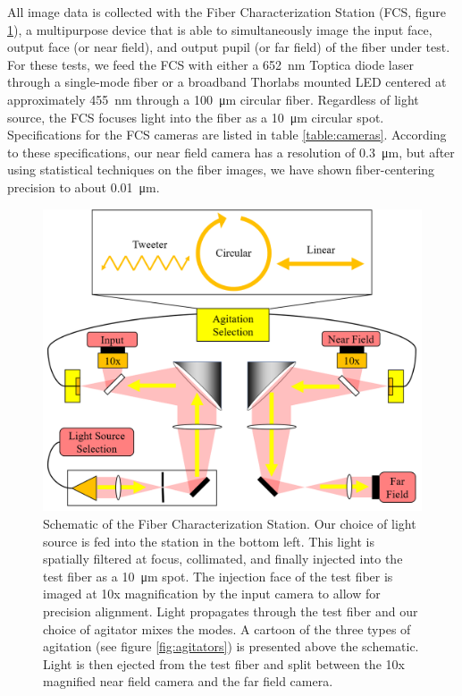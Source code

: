 \documentclass[twocolumn]{emulateapj}
\begin{document}
All image data is collected with the Fiber Characterization Station (FCS, figure \ref{fig:fcs}), a multipurpose device that is able to simultaneously image the input face, output face (or near field), and output pupil (or far field) of the fiber under test. For these tests, we feed the FCS with either a \SI{652}{\nano\meter} Toptica diode laser through a single-mode fiber or a broadband Thorlabs mounted LED centered at approximately \SI{455}{\nano\meter} through a \SI{100}{\micro\meter} circular fiber. Regardless of light source, the FCS focuses light into the fiber as a \SI{10}{\micro\meter} circular spot. Specifications for the FCS cameras are listed in table \ref{table:cameras}. According to these specifications, our near field camera has a resolution of \SI{0.3}{\micro\meter}, but after using statistical techniques on the fiber images, we have shown fiber-centering precision to about \SI{0.01}{\micro\meter}. 

\begin{figure}
\centering
	\includegraphics[width=\columnwidth]{images/fcs_schematic.png}
	\caption{Schematic of the Fiber Characterization Station. Our choice of light source is fed into the station in the bottom left. This light is spatially filtered at focus, collimated, and finally injected into the test fiber as a \SI{10}{\micro\meter} spot. The injection face of the test fiber is imaged at 10x magnification by the input camera to allow for precision alignment. Light propagates through the test fiber and our choice of agitator mixes the modes. A cartoon of the three types of agitation (see figure \ref{fig:agitators}) is presented above the schematic. Light is then ejected from the test fiber and split between the 10x magnified near field camera and the far field camera.}
\label{fig:fcs}
\end{figure}
\end{document}
